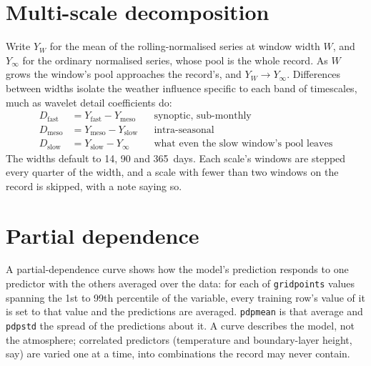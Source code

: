\documentclass[11pt]{report}
\newcommand{\codeunderscore}{\textunderscore\allowbreak}
\newcommand{\code}[1]{\texttt{\let\_\codeunderscore #1}}
\begin{document}
\section{Multi-scale decomposition}\label{sec:multiscale}
Write $Y_W$ for the mean of the rolling-normalised series at window width $W$, and
$Y_\infty$ for the ordinary normalised series, whose pool is the whole record. As $W$
grows the window's pool approaches the record's, and $Y_W \to Y_\infty$. Differences
between widths isolate the weather influence specific to each band of timescales,
much as wavelet detail coefficients do:
\begin{align}
  D_\text{fast} &= Y_\text{fast} - Y_\text{meso} && \text{synoptic, sub-monthly} \\
  D_\text{meso} &= Y_\text{meso} - Y_\text{slow} && \text{intra-seasonal} \\
  D_\text{slow} &= Y_\text{slow} - Y_\infty      && \text{what even the slow window's pool leaves}
\end{align}
The widths default to 14, 90 and 365~days. Each scale's windows are stepped every quarter
of the width, and a scale with fewer than two windows on the record is skipped, with a
note saying so.

\section{Partial dependence}\label{sec:pdptheory}
A partial-dependence curve shows how the model's prediction responds to one predictor
with the others averaged over the data: for each of \code{grid\_points} values spanning
the 1st to 99th percentile of the variable, every training row's value of it is set to
that value and the predictions are averaged. \code{pdp\_mean} is that average and
\code{pdp\_std} the spread of the predictions about it. A curve describes the model, not
the atmosphere; correlated predictors (temperature and boundary-layer height, say) are
varied one at a time, into combinations the record may never contain.
\end{document}
